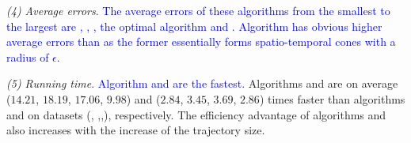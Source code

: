 \sstab\emph{(4) Average errors}. \textcolor{blue}{The average errors of these algorithms from the smallest to the largest are \squishe, \dps, \cist, the optimal algorithm and \cista. Algorithm \cista has obvious higher average errors than \cist as the former essentially forms spatio-temporal cones with a radius of $\epsilon$.}


\sstab\emph{(5) Running time}. \textcolor{blue}{Algorithm \cist and \cista are the fastest.} Algorithms \cist and \cista are on average
($14.21$, $18.19$, $17.06$, $9.98$) and ($2.84$, $3.45$, $3.69$, $2.86$) times faster than algorithms \dps and \squishe on {datasets} (\sercar, {\geolife},\mopsi,\pricar), respectively.
The efficiency advantage of algorithms \cist and \cista also increases  with the increase of the trajectory size.






